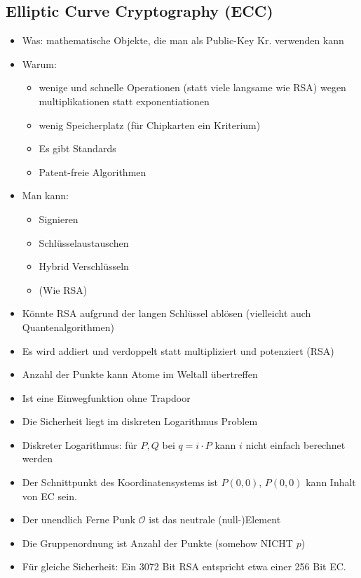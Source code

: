 \documentclass[12pt]{scrartcl}
\begin{document}
\newpage
\subsection{Elliptic Curve Cryptography (ECC)}

\begin{itemize}
    \item Was: mathematische Objekte, die man als Public-Key Kr. verwenden kann
    \item Warum:
    \begin{itemize}
        \item wenige und schnelle Operationen (statt viele langsame wie RSA) wegen 
        multiplikationen statt exponentiationen 
        \item wenig Speicherplatz (für Chipkarten ein Kriterium)
        \item Es gibt Standards
        \item Patent-freie Algorithmen
    \end{itemize}
    \item Man kann:
    \begin{itemize}
        \item Signieren
        \item Schlüsselaustauschen
        \item Hybrid Verschlüsseln
        \item (Wie RSA)
    \end{itemize}
    \item Könnte RSA aufgrund der langen Schlüssel ablösen (vielleicht auch Quantenalgorithmen)
    \item Es wird addiert und verdoppelt statt multipliziert und potenziert (RSA)
    \item Anzahl der Punkte kann Atome im Weltall übertreffen
    \item Ist eine Einwegfunktion ohne Trapdoor
    \item Die Sicherheit liegt im diskreten Logarithmus Problem
    \item Diskreter Logarithmus: für $P,Q$ bei $q = i \cdot P$ kann $i$ nicht einfach berechnet werden
    \item Der Schnittpunkt des Koordinatensystems ist $P(0,0)$, $P(0,0)$ kann Inhalt von EC sein.
    \item Der unendlich Ferne Punk $\mathcal{O}$ ist das neutrale (null-)Element
    \item Die Gruppenordnung ist Anzahl der Punkte (somehow NICHT $p$)
    \item Für gleiche Sicherheit: Ein 3072 Bit RSA entspricht etwa einer 256 Bit EC.
\end{itemize}
\end{document}
